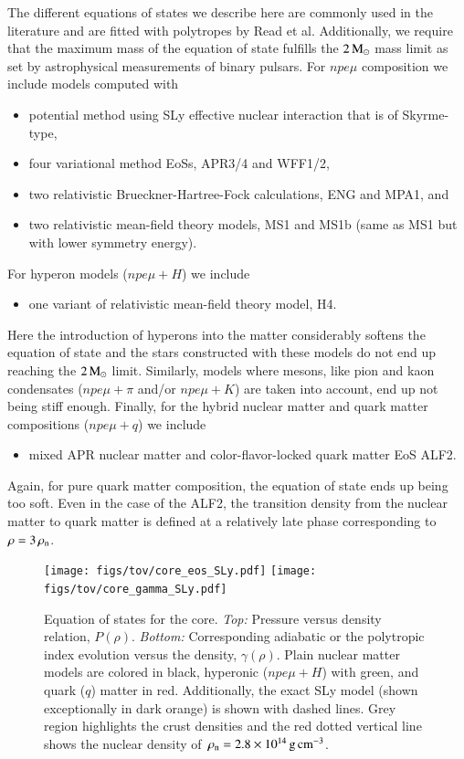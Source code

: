 The different equations of states we describe here are commonly used in the literature\cite{LP01, Bejger05, H4} and are fitted with polytropes by Read et al.\cite{Read09}
Additionally, we require that the maximum mass of the equation of state fulfills the $2\, \mathrm{M}_{\odot}$ mass limit as set by astrophysical measurements of binary pulsars.\cite{DPR10, AFW13, Fonseca16}
For $npe\mu$ composition we include models computed with
\begin{itemize}
    \item potential method using SLy effective nuclear interaction that is of Skyrme-type,\cite{SLy}
    \item four variational method EoSs, APR3/4\cite{APR} and WFF1/2,\cite{WFF}
    \item two relativistic Brueckner-Hartree-Fock calculations, ENG\cite{ENG} and MPA1,\cite{MPA} and
    \item two relativistic mean-field theory models, MS1 and MS1b (same as MS1 but with lower symmetry energy).\cite{MS}
\end{itemize}
For hyperon models ($npe\mu + H$) we include
\begin{itemize}
    \item one variant of relativistic mean-field theory model, H4.\cite{H4}
\end{itemize}
Here the introduction of hyperons into the matter considerably softens the equation of state and the stars constructed with these models do not end up reaching the $2\, \mathrm{M}_{\odot}$ limit.
Similarly, models where mesons, like pion and kaon condensates ($npe\mu + \pi$ and/or $npe\mu + K$) are taken into account, end up not being stiff enough.
Finally, for the hybrid nuclear matter and quark matter compositions ($npe\mu + q$) we include 
\begin{itemize}
    \item mixed APR nuclear matter and color-flavor-locked quark matter EoS ALF2.\cite{ALF}
\end{itemize}
Again, for pure quark matter composition, the equation of state ends up being too soft. 
Even in the case of the ALF2, the transition density from the nuclear matter to quark matter is defined at a relatively late phase corresponding to $\rho = 3\, \rho_{\mathrm{n}} $.

\begin{figure}[t!]
\centering
\texttt{[image: figs/tov/core\_eos\_SLy.pdf]}
\texttt{[image: figs/tov/core\_gamma\_SLy.pdf]}
\caption{\label{fig:coreGamma}
Equation of states for the core.
\emph{Top:} Pressure versus density relation, $P(\rho)$.
\emph{Bottom:} Corresponding adiabatic or the polytropic index evolution versus the density, $\gamma(\rho)$.
Plain nuclear matter models are colored in black, hyperonic ($npe\mu+H$) with green, and quark ($q$) matter in red.
Additionally, the exact SLy model (shown exceptionally in dark orange) is shown with dashed lines.
Grey region highlights the crust densities and the red dotted vertical line shows the nuclear density of $\, \rho_{\mathrm{n}}  = 2.8 \times 10^{14}\, \mathrm{g}\,\mathrm{cm}^{-3}$.
}
\end{figure}

